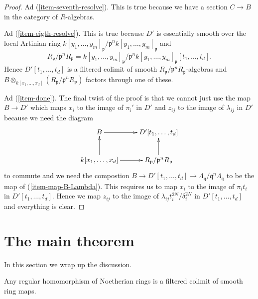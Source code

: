 \begin{proof}
\medskip\noindent
Ad (\ref{item-seventh-resolve}). This is true because we have a
section $C \to B$ in the category of $R$-algebras.

\medskip\noindent
Ad (\ref{item-eigth-resolve}). This is true because $D'$ is
essentially smooth over the local Artinian ring
$k[y_1, \ldots, y_m]_\mathfrak p/\mathfrak p^n k[y_1, \ldots, y_m]_\mathfrak p$
and
$$
R_\mathfrak p/\mathfrak p^nR_\mathfrak p =
k[y_1, \ldots, y_m]_\mathfrak p/
\mathfrak p^n k[y_1, \ldots, y_m]_\mathfrak p[t_1, \ldots, t_d].
$$
Hence $D'[t_1, \ldots, t_d]$ is a filtered colimit of smooth
$R_\mathfrak p/\mathfrak p^nR_\mathfrak p$-algebras and
$B \otimes_{k[x_1, \ldots, x_d]} (R_\mathfrak p/\mathfrak p^nR_\mathfrak p)$
factors through one of these.

\medskip\noindent
Ad (\ref{item-done}). The final twist of the proof is that we cannot
just use the map $B \to D'$ which maps $x_i$ to the image of $\pi_i'$
in $D'$ and $z_{ij}$ to the image of $\lambda_{ij}$ in $D'$
because we need the diagram
$$
\xymatrix{
B \ar[r] & D'[t_1, \ldots, t_d] \\
k[x_1, \ldots, x_d] \ar[r] \ar[u] &
R_\mathfrak p/\mathfrak p^nR_\mathfrak p \ar[u]
}
$$
to commute and we need the compostion
$B \to D'[t_1, \ldots, t_d] \to
\Lambda_\mathfrak q/\mathfrak q^n\Lambda_\mathfrak q$
to be the map of (\ref{item-map-B-Lambda}).
This requires us to map $x_i$ to the image of
$\pi_i t_i$ in $D'[t_1, \ldots, t_d]$.
Hence we map $z_{ij}$ to the image of
$\lambda_{ij} t_i^{2N} / \delta_i^{2N}$ in $D'[t_1, \ldots, t_d]$
and everything is clear.
\end{proof}







\section{The main theorem}
\label{section-main}

\noindent
In this section we wrap up the discussion.

\begin{theorem}[Popescu]
\label{theorem-popescu}
Any regular homomorphism of Noetherian rings is a filtered colimit
of smooth ring maps.
\end{theorem}

